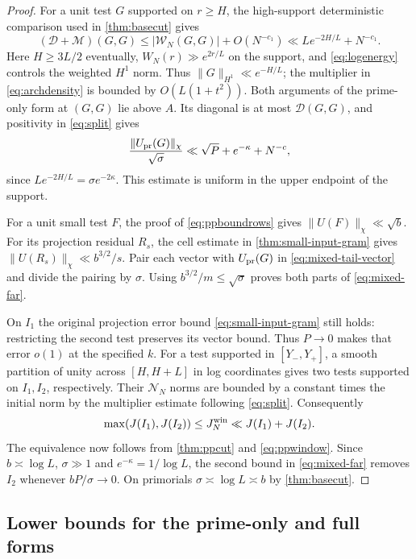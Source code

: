 \documentclass[11pt,a4paper]{article}
\numberwithin{equation}{section}
\newcommand{\NN}{\mathcal N_N}
\begin{document}
\begin{proof}
For a unit test $G$ supported on $r\ge H$, the high-support
deterministic comparison used in \cref{thm:basecut} gives
\[
 (\mathcal D+\mathcal M)(G,G)
 \le |\mathcal W_N(G,G)|+O(N^{-c_1})
 \ll L e^{-2H/L}+N^{-c_1}.
\]
Here $H\ge3L/2$ eventually, $W_N(r)\gg e^{2r/L}$ on the
support, and \eqref{eq:logenergy} controls the weighted $H^1$
norm. Thus $\|G\|_{H^1}\ll e^{-H/L}$; the multiplier in
\eqref{eq:archdensity} is bounded by $O(L(1+t^2))$.
Both arguments of the prime-only form at $(G,G)$ lie above $A$.
Its diagonal is at most $\mathcal D(G,G)$, and positivity in
\eqref{eq:split} gives
\begin{equation}
 \frac{\|U_{\rm pr}(G)\|_\chi}{\sqrt{\sigma}}
 \ll \sqrt P+e^{-\kappa}+N^{-c},
 \label{eq:mixed-tail-vector}
\end{equation}
since $Le^{-2H/L}=\sigma e^{-2\kappa}$. This estimate is uniform
in the upper endpoint of the support.

For a unit small test $F$, the proof of \cref{eq:ppboundrows}
gives $\|U(F)\|_\chi\ll\sqrt b$. For its projection residual
$R_s$, the cell estimate in \cref{thm:small-input-gram} gives
$\|U(R_s)\|_\chi\ll b^{3/2}/s$. Pair each vector with
$U_{\rm pr}(G)$ in \eqref{eq:mixed-tail-vector} and divide the
pairing by $\sigma$. Using $b^{3/2}/m\le\sqrt{\sigma}$
proves both parts of \cref{eq:mixed-far}.

On $I_1$ the original projection error bound
\eqref{eq:small-input-gram} still holds: restricting the second
test preserves its vector bound. Thus $P\to0$ makes that error
$o(1)$ at the specified $k$. For a test supported in
$[Y_-,Y_+]$, a smooth partition of unity across $[H,H+L]$ in log
coordinates gives two tests supported on $I_1,I_2$, respectively.
Their $\NN$ norms are bounded by a constant times the initial norm
by the multiplier estimate following \eqref{eq:split}.
Consequently
\[
 \max(J(I_1),J(I_2))\le J_N^{\rm win}
       \ll J(I_1)+J(I_2).
\]
The equivalence now follows from \cref{thm:ppcut} and
\eqref{eq:ppwindow}. Since $b\asymp\log L$, $\sigma\gg1$ and
$e^{-\kappa}=1/\log L$, the second bound in \eqref{eq:mixed-far}
removes $I_2$ whenever $bP/\sigma\to0$.
On primorials $\sigma\asymp\log L\asymp b$ by \cref{thm:basecut}.
\end{proof}

\subsection{Lower bounds for the prime-only and full forms}
\end{document}

